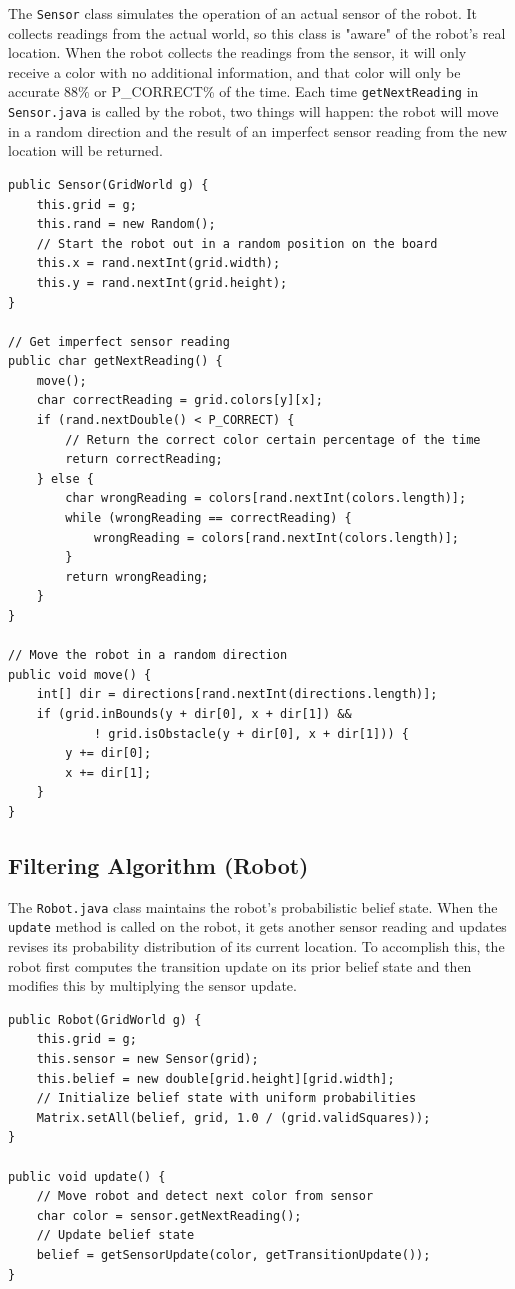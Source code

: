 \documentclass{article}
\begin{document}
The \verb`Sensor` class simulates the operation of an actual sensor of the robot. It collects readings from the actual world, so this class is "aware" of the robot's real location. When the robot collects the readings from the sensor, it will only receive a color with no additional information, and that color will only be accurate $88\%$ or P\_CORRECT\% of the time. Each time \verb`getNextReading` in \verb`Sensor.java` is called by the robot, two things will happen: the robot will move in a random direction and the result of an imperfect sensor reading from the new location will be returned.

\vspace{5mm}

\begin{lstlisting}
public Sensor(GridWorld g) {
	this.grid = g;
	this.rand = new Random();
	// Start the robot out in a random position on the board
	this.x = rand.nextInt(grid.width);
	this.y = rand.nextInt(grid.height);
}

// Get imperfect sensor reading
public char getNextReading() {
	move();
	char correctReading = grid.colors[y][x];
	if (rand.nextDouble() < P_CORRECT) {
		// Return the correct color certain percentage of the time
		return correctReading;
	} else {
		char wrongReading = colors[rand.nextInt(colors.length)];
		while (wrongReading == correctReading) {
			wrongReading = colors[rand.nextInt(colors.length)];
		}
		return wrongReading;
	}
}

// Move the robot in a random direction
public void move() {
	int[] dir = directions[rand.nextInt(directions.length)];
	if (grid.inBounds(y + dir[0], x + dir[1]) && 
			! grid.isObstacle(y + dir[0], x + dir[1])) {
		y += dir[0];
		x += dir[1];
	}
}
\end{lstlisting}

\subsection{Filtering Algorithm (Robot)}

The \verb`Robot.java` class maintains the robot's probabilistic belief state. When the \verb`update` method is called on the robot, it gets another sensor reading and updates revises its probability distribution of its current location. To accomplish this, the robot first computes the transition update on its prior belief state and then modifies this by multiplying the sensor update. 

\begin{lstlisting}
public Robot(GridWorld g) {
	this.grid = g;
	this.sensor = new Sensor(grid);
	this.belief = new double[grid.height][grid.width];
	// Initialize belief state with uniform probabilities
	Matrix.setAll(belief, grid, 1.0 / (grid.validSquares));
}

public void update() {
	// Move robot and detect next color from sensor
	char color = sensor.getNextReading();
	// Update belief state
	belief = getSensorUpdate(color, getTransitionUpdate());
}
\end{lstlisting}
\end{document}
